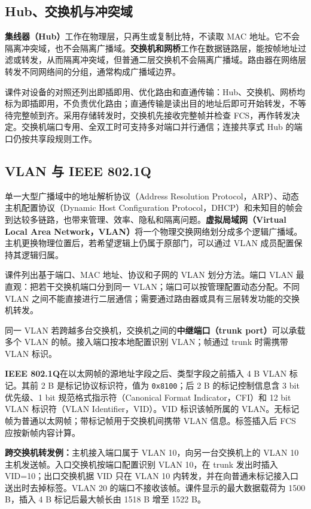 
\subsection{Hub、交换机与冲突域}
\textbf{集线器（Hub）}工作在物理层，只再生或复制比特，不读取 MAC 地址。它不会隔离冲突域，也不会隔离广播域。\textbf{交换机和网桥}工作在数据链路层，能按帧地址过滤或转发，从而隔离冲突域，但普通二层交换机不会隔离广播域。路由器在网络层转发不同网络间的分组，通常构成广播域边界。

课件对设备的对照还列出即插即用、优化路由和直通传输：Hub、交换机、网桥均标为即插即用，不负责优化路由；直通传输是读出目的地址后即可开始转发，不等待完整帧到齐。采用存储转发时，交换机先接收完整帧并检查 FCS，再作转发决定。交换机端口专用、全双工时可支持多对端口并行通信；连接共享式 Hub 的端口仍按共享段规则工作。


\subsection{VLAN 与 IEEE 802.1Q}
单一大型广播域中的地址解析协议（Address Resolution Protocol，ARP）、动态主机配置协议（Dynamic Host Configuration Protocol，DHCP）和未知目的帧会到达较多链路，也带来管理、效率、隐私和隔离问题。\textbf{虚拟局域网（Virtual Local Area Network，VLAN）}将一个物理交换网络划分成多个逻辑广播域。主机更换物理位置后，若希望逻辑上仍属于原部门，可以通过 VLAN 成员配置保持其逻辑归属。

课件列出基于端口、MAC 地址、协议和子网的 VLAN 划分方法。端口 VLAN 最直观：把若干交换机端口分到同一 VLAN；端口可以按管理配置动态分配。不同 VLAN 之间不能直接进行二层通信；需要通过路由器或具有三层转发功能的交换机转发。

同一 VLAN 若跨越多台交换机，交换机之间的\textbf{中继端口（trunk port）}可以承载多个 VLAN 的帧。接入端口按本地配置识别 VLAN；帧通过 trunk 时需携带 VLAN 标识。

\textbf{IEEE 802.1Q}在以太网帧的源地址字段之后、类型字段之前插入 4 B VLAN 标记。其前 2 B 是标记协议标识符，值为 \texttt{0x8100}；后 2 B 的标记控制信息含 3 bit 优先级、1 bit 规范格式指示符（Canonical Format Indicator，CFI）和 12 bit VLAN 标识符（VLAN Identifier，VID）。VID 标识该帧所属的 VLAN。无标记帧为普通以太网帧；带标记帧用于交换机间携带 VLAN 信息。标签插入后 FCS 应按新帧内容计算。

\textbf{跨交换机转发例：}主机接入端口属于 VLAN 10，向另一台交换机上的 VLAN 10 主机发送帧。入口交换机按端口配置识别 VLAN 10，在 trunk 发出时插入 VID=10；出口交换机据 VID 只在 VLAN 10 内转发，并在向普通未标记接入口送出时去掉标签。VLAN 20 的端口不接收该帧。课件显示的最大数据载荷为 1500 B，插入 4 B 标记后最大帧长由 1518 B 增至 1522 B。

